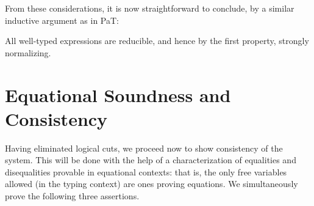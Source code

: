 \documentclass{fundam}
\begin{document}
From these considerations, it is now straightforward to conclude,
by a similar inductive argument as in PaT:

\begin{theorem}
All well-typed expressions are reducible, and hence by the first
property, strongly normalizing.
\end{theorem}

\section{Equational Soundness and Consistency}

Having eliminated logical cuts, we proceed now to show consistency of
the system.  This will be done with the help of a characterization of
equalities and disequalities provable in equational contexts: that is,
the only free variables allowed (in the typing context) are ones
proving equations.  We simultaneously prove the following three
assertions.
\end{document}
